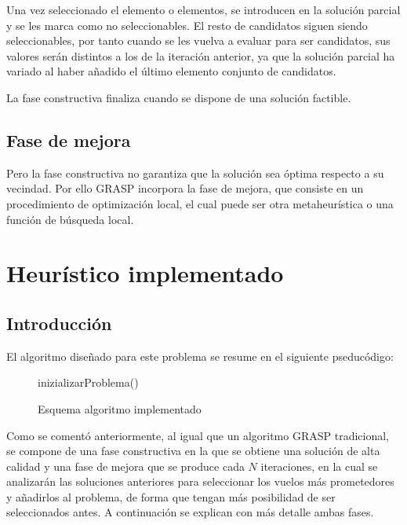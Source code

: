 Una vez seleccionado el elemento o elementos, se introducen en la solución parcial y se les marca como no seleccionables. El resto de candidatos siguen siendo seleccionables, por tanto cuando se les vuelva a evaluar para ser candidatos, sus valores serán distintos a los de la iteración anterior, ya que la solución parcial ha variado al haber añadido el último elemento conjunto de candidatos.

La fase constructiva finaliza cuando se dispone de una solución factible.
\subsection{Fase de mejora}
Pero la fase constructiva no garantiza que la solución sea óptima respecto a su vecindad. Por ello GRASP incorpora la fase de mejora, que consiste en un procedimiento de optimización local, el cual puede ser otra metaheurística o una función de búsqueda local.
\section{Heurístico implementado}
\subsection{Introducción}
El algoritmo diseñado para este problema se resume en el siguiente pseducódigo:\\

\begin{figure}[ht]
	\centering
	\begin{minipage}{.7\linewidth}
		\begin{algorithm}[H]
			\SetAlgoLined
			inizializarProblema()\;
		\caption{Esquema algoritmo implementado}
	\end{algorithm}
\end{minipage}
\end{figure}


Como se comentó anteriormente, al igual que un algoritmo GRASP tradicional, se compone de una fase constructiva en la que se obtiene una solución de alta calidad y una fase de mejora que se produce cada $N$ iteraciones, en la cual se analizarán las soluciones anteriores para seleccionar los vuelos más prometedores y añadirlos al problema, de forma que tengan más posibilidad de ser seleccionados antes. A continuación se explican con más detalle ambas fases.

